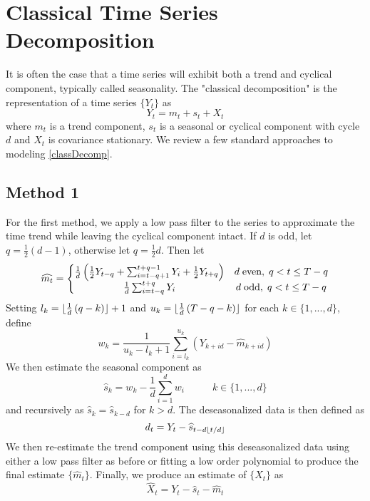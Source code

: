 \documentclass[11pt]{article}
\DeclarePairedDelimiter\floor{\lfloor}{\rfloor}
\begin{document}
\section{Classical Time Series Decomposition}
It is often the case that a time series will exhibit both a trend and cyclical component, typically called seasonality. The "classical decomposition" is the representation of a time series $\{ Y_t \}$ as
\begin{equation} \label{classDecomp}
Y_t = m_t + s_t + X_t
\end{equation}
where $m_t$ is a trend component, $s_t$ is a seasonal or cyclical component with cycle $d$ and $X_t$ is covariance stationary. We review a few standard approaches to modeling \eqref{classDecomp}.
\subsection{Method 1}
For the first method, we apply a low pass filter to the series to approximate the time trend while leaving the cyclical component intact. If $d$ is odd, let $q = \frac{1}{2} \left( d -1 \right)$, otherwise let $q = \frac{1}{2}d$. Then let
\begin{equation}
\widehat{m_t} = \left\{
\begin{matrix}
\frac{1}{d} \left( \frac{1}{2} Y_{t-q} + \sum_{i=t-q+1}^{t+q-1} Y_i + \frac{1}{2} Y_{t + q} \right) & d \; \textup{even}, \; q < t \leq T - q \\
\frac{1}{d} \sum_{i= t - q}^{t + q} Y_i & d \; \textup{odd}, \; q < t \leq T - q
\end{matrix}
\right.
\end{equation}
Setting $l_k = \floor{\frac{1}{d} \left(q - k \right)} +1$ and $u_k = \floor{\frac{1}{d} \left( T - q -k \right)}$ for each $k \in \{1,...,d \}$, define
\begin{equation}
w_k = \frac{1}{u_k - l_k +1}\sum_{i = l_k}^{u_k} \left( Y_{k+id} - \widehat{m}_{k+id} \right)
\end{equation}
We then estimate the seasonal component as
\begin{equation}
\widehat{s}_k = w_k - \frac{1}{d} \sum_{i=1}^d w_i \;\;\;\;\;\;\;\;\;\; k \in \{1,...,d\}
\end{equation}
and recursively as $\widehat{s}_k = \widehat{s}_{k-d}$ for $k>d$.
The deseasonalized data is then defined as
\begin{equation}
d_t = Y_t - \widehat{s}_{t - d \floor{t/d}}
\end{equation}
We then re-estimate the trend component using this deseasonalized data using either a low pass filter as before or fitting a low order polynomial to produce the final estimate $\{ \widehat{m}_t \}$. Finally, we produce an estimate of $\{ X_t \}$ as
\begin{equation}
\widehat{X}_t = Y_t - \widehat{s}_t - \widehat{m}_t
\end{equation}
\end{document}
